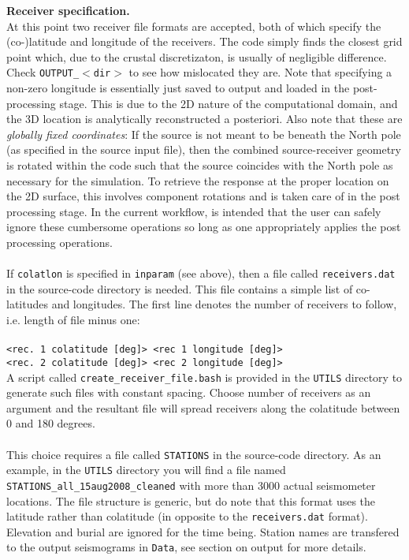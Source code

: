 \documentclass[11pt,letter,fleqn,english,notitlepage]{article}
\begin{document}
\noindent \textbf{Receiver specification.}\\
At this point two receiver file formats are accepted, both of which specify the (co-)latitude and longitude of the
receivers. The code simply finds the closest grid point which, due to the
crustal discretizaton, is usually of negligible difference. Check {\tt OUTPUT\_$<$dir$>$} to see how mislocated they are.
Note that specifying a non-zero longitude is essentially just saved to output and loaded in the 
post-processing stage. This is due to the 2D nature of the computational domain, and the 3D location is analytically reconstructed 
a posteriori. Also note that these are \textit{globally fixed coordinates}: If the source is not meant to be beneath the North pole 
(as specified in the source input file), then the combined source-receiver geometry is rotated within the code such that the source 
coincides with the North pole as necessary for the simulation. 
To retrieve the response at the proper location on the 2D surface, 
this involves component rotations and is taken care of in the post processing stage. In the current 
workflow, is intended that the user can safely ignore these cumbersome operations so long as one appropriately applies 
the post processing operations. \\

\\
If {\tt colatlon} is specified in {\tt inparam} (see above), then a file called {\tt receivers.dat} in the source-code directory 
is needed. This file contains a simple list of co-latitudes and longitudes. 
The first line denotes the number of receivers to follow, i.e. length of file minus one:\\
{\tt <number of receivers>\\
<rec. 1 colatitude [deg]> <rec 1 longitude [deg]>\\
<rec. 2 colatitude [deg]> <rec 2 longitude [deg]>}\\

\noindent 
A script called {\tt create\_receiver\_file.bash} is provided in the {\tt UTILS} directory to generate such files with constant 
spacing. Choose number of receivers as an argument and the resultant file will spread receivers along the colatitude between 0 and 
180 degrees.\\

\\
This choice requires a file called {\tt STATIONS} in the source-code directory. As an example,
in the {\tt UTILS} directory you will find a file named {\tt STATIONS\_all\_15aug2008\_cleaned} 
with more than 3000 actual seismometer locations.
The file structure is generic, but do note that this format uses the latitude rather than colatitude 
(in opposite to the {\tt receivers.dat} format). 
Elevation and burial are ignored for the time being. Station names are transfered to the 
output seismograms in {\tt Data}, see section on output for more details.
\end{document}
